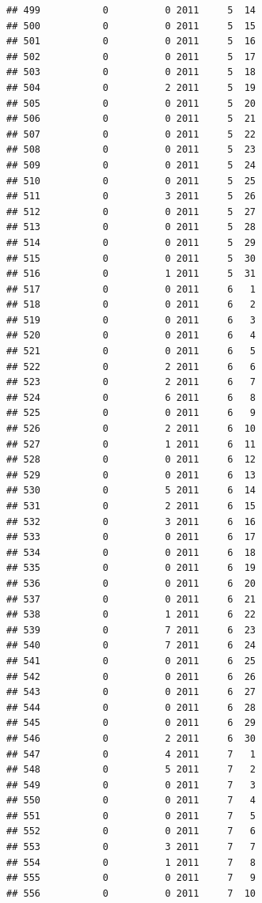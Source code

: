 \documentclass[
]{article}
\begin{document}
\begin{verbatim}
## 499           0          0 2011     5  14
## 500           0          0 2011     5  15
## 501           0          0 2011     5  16
## 502           0          0 2011     5  17
## 503           0          0 2011     5  18
## 504           0          2 2011     5  19
## 505           0          0 2011     5  20
## 506           0          0 2011     5  21
## 507           0          0 2011     5  22
## 508           0          0 2011     5  23
## 509           0          0 2011     5  24
## 510           0          0 2011     5  25
## 511           0          3 2011     5  26
## 512           0          0 2011     5  27
## 513           0          0 2011     5  28
## 514           0          0 2011     5  29
## 515           0          0 2011     5  30
## 516           0          1 2011     5  31
## 517           0          0 2011     6   1
## 518           0          0 2011     6   2
## 519           0          0 2011     6   3
## 520           0          0 2011     6   4
## 521           0          0 2011     6   5
## 522           0          2 2011     6   6
## 523           0          2 2011     6   7
## 524           0          6 2011     6   8
## 525           0          0 2011     6   9
## 526           0          2 2011     6  10
## 527           0          1 2011     6  11
## 528           0          0 2011     6  12
## 529           0          0 2011     6  13
## 530           0          5 2011     6  14
## 531           0          2 2011     6  15
## 532           0          3 2011     6  16
## 533           0          0 2011     6  17
## 534           0          0 2011     6  18
## 535           0          0 2011     6  19
## 536           0          0 2011     6  20
## 537           0          0 2011     6  21
## 538           0          1 2011     6  22
## 539           0          7 2011     6  23
## 540           0          7 2011     6  24
## 541           0          0 2011     6  25
## 542           0          0 2011     6  26
## 543           0          0 2011     6  27
## 544           0          0 2011     6  28
## 545           0          0 2011     6  29
## 546           0          2 2011     6  30
## 547           0          4 2011     7   1
## 548           0          5 2011     7   2
## 549           0          0 2011     7   3
## 550           0          0 2011     7   4
## 551           0          0 2011     7   5
## 552           0          0 2011     7   6
## 553           0          3 2011     7   7
## 554           0          1 2011     7   8
## 555           0          0 2011     7   9
## 556           0          0 2011     7  10

\end{verbatim}
\end{document}
